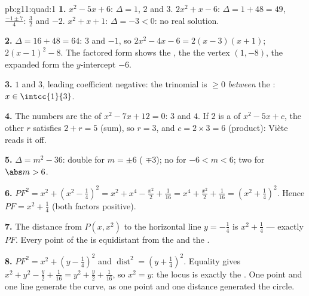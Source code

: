 \begin{solution}{pb:g11:quad:1}
\textbf{1.} $x^2 - 5x + 6$: $\Delta = 1$,  $2$ and $3$.
$2x^2 + x - 6$: $\Delta = 1 + 48 = 49$, 
$\frac{-1 \pm 7}{4}$: $\frac32$ and $-2$. $x^2 + x + 1$:
$\Delta = -3 < 0$: no real solution.

\textbf{2.} $\Delta = 16 + 48 = 64$:  $3$ and $-1$, so
$2x^2 - 4x - 6 = 2(x - 3)(x + 1)$; 
$2(x - 1)^2 - 8$. The factored form shows the , the
 the vertex $(1, -8)$, the expanded form the
$y$-intercept $-6$.

\textbf{3.}  $1$ and $3$, leading coefficient negative:
the trinomial is $\geq 0$ \emph{between} the :
$x \in \intcc{1}{3}$.

\textbf{4.} The numbers are the  of $x^2 - 7x + 12 = 0$:
$3$ and $4$. If $2$ is a  of $x^2 - 5x + c$, the other 
$r$ satisfies $2 + r = 5$ (sum), so $r = 3$, and
$c = 2 \times 3 = 6$ (product): Vi\`ete reads it off.

\textbf{5.} $\Delta = m^2 - 36$: double  for $m = \pm 6$
( $\mp 3$); no  for $-6 < m < 6$; two  for
$\abs m > 6$.

\textbf{6.} $PF^2 = x^2 + \left(x^2 - \frac14\right)^2
= x^2 + x^4 - \frac{x^2}{2} + \frac{1}{16}
= x^4 + \frac{x^2}{2} + \frac{1}{16}
= \left(x^2 + \frac14\right)^2$. Hence
$PF = x^2 + \frac14$ (both factors positive).

\textbf{7.} The distance from $P(x, x^2)$ to the horizontal
line $y = -\frac14$ is $x^2 + \frac14$ --- exactly $PF$. Every
point of the  is equidistant from the  and the
.

\textbf{8.} $PF^2 = x^2 + \left(y - \frac14\right)^2$ and
$\operatorname{dist}^2 = \left(y + \frac14\right)^2$. Equality
gives $x^2 + y^2 - \frac y2 + \frac{1}{16} = y^2 + \frac y2 +
\frac1{16}$, so $x^2 = y$: the locus is exactly the .
One point and one line generate the curve, as one point and one
distance generated the circle.


\end{solution}
